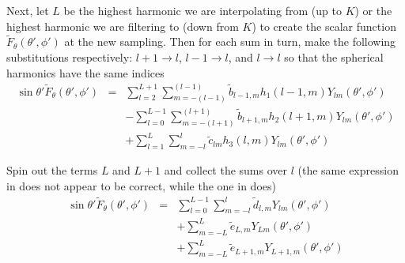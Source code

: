 Next, let $L$ be the highest harmonic we are interpolating from (up to $K$) or the highest harmonic we are filtering to (down from $K$) to create the scalar function $\widetilde F_{\theta}(\theta',\phi')$ at the new sampling.  Then for each sum in turn, make the following substitutions respectively: $l+1 \rightarrow l $, $l-1 \rightarrow l $, and $l \rightarrow l$ so that the spherical harmonics have the same indices
\begin{eqnarray}
\sin\theta' \widetilde F_{\theta}(\theta',\phi') &=& \sum_{l=2}^{L+1} \sum_{m = -(l-1)}^{(l-1)} \widetilde b_{l-1,m} h_1(l-1,m) Y_{lm}(\theta',\phi') \nonumber \\
\ & \ & - \sum_{l=0}^{L-1} \sum_{m = -(l+1)}^{(l+1)} \widetilde b_{l+1,m} h_2(l+1,m) Y_{lm} (\theta',\phi') \nonumber \\
\ & \  & + \sum_{l=1}^{L} \sum_{m = -l}^{l} \widetilde c_{lm} h_3(l,m) Y_{lm}(\theta',\phi')
\end{eqnarray}


Spin out the terms $L$ and $L+1$ and collect the sums over $l$ (the same expression in \cite{yucel2008helmholtz} does not appear to be correct, while the one in \cite{shanker2003fast} does)
\begin{eqnarray}
\sin\theta' \widetilde F_{\theta}(\theta',\phi') &=& \sum_{l=0}^{L-1} \sum_{m = -l}^l \widetilde d_{l,m} Y_{lm}(\theta',\phi') \nonumber \\
\ & \ &  + \sum_{m = -L}^{L} \widetilde e_{L,m} Y_{Lm} (\theta',\phi') \nonumber \\
\ & \  & + \sum_{m = -L}^{L} \widetilde e_{L+1,m} Y_{L+1,m}(\theta',\phi')
\end{eqnarray}


